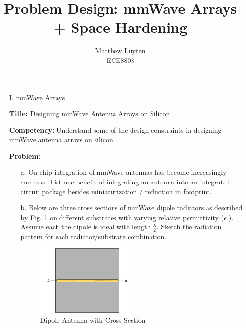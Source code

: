 \documentclass[12pt]{article}
\begin{document}
 
\title{Problem Design: mmWave Arrays + Space Hardening}
\author{Matthew Luyten\\ %
ECE8803}

\maketitle

\begin{enumerate} 
    \Large\item[I.] mmWave Arrays
    \normalsize
    
    \textbf{Title:} Designing mmWave Antenna Arrays on Silicon

    \textbf{Competency:} Understand some of the design constraints in designing mmWave antenna arrays on silicon.

    \textbf{Problem:}
    
    \begin{enumerate}
        \item[a.] On-chip integration of mmWave antennas has become increasingly common. List one benefit of integrating an antenna
        into an integrated circuit package besides miniaturization / reduction in footprint.

        \vspace{3cm}

        \item[b.] Below are three cross sections of mmWave dipole radiators as described by Fig. 1 on different substrates with varying relative permittivity ($\epsilon_r$). 
        Assume each the dipole is ideal with length $\frac{\lambda}{2}$. Sketch the radiation pattern for each radiator/substrate combination.

        \begin{figure}[!ht]
            \centering
            \includegraphics[width=2in]{crossection.png}
            \caption{Dipole Antenna with Cross Section}
        \end{figure}

        \clearpage

        \phantom{}


\end{enumerate}
\end{enumerate}
\end{document}
